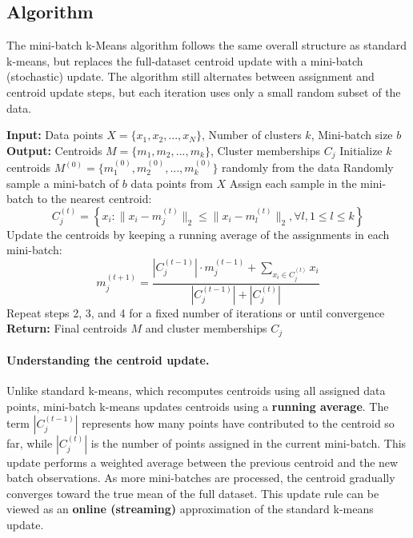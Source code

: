 \documentclass{article}
\begin{document}
\subsection{Algorithm}

The mini-batch k-Means algorithm follows the same overall structure as
standard k-means, but replaces the full-dataset centroid update with a
mini-batch (stochastic) update. The algorithm still alternates between
assignment and centroid update steps, but each iteration uses only a small
random subset of the data.

\begin{algorithm}[H]
\caption{Mini-batch k-Means Clustering Algorithm (Training Phase)}
\begin{algorithmic}[1]
\State \textbf{Input:} Data points $X = \{x_1, x_2, ..., x_N\}$, Number of clusters $k$, Mini-batch size $b$
\State \textbf{Output:} Centroids $M = \{m_1, m_2, ..., m_k\}$, Cluster memberships $C_j$
\State Initialize $k$ centroids $M^{(0)} = \{m_1^{(0)}, m_2^{(0)}, ..., m_k^{(0)}\}$ randomly from the data
\Repeat
    \State Randomly sample a mini-batch of $b$ data points from $X$
    \State Assign each sample in the mini-batch to the nearest centroid:
    \[
    C_j^{(t)} = \left\{ x_i : \|x_i - m_j^{(t)}\|_2 \leq \|x_i - m_l^{(t)}\|_2, \forall l, 1 \leq l \leq k \right\}
    \]
    \State Update the centroids by keeping a running average of the assignments in each mini-batch:
    \[
    m_j^{(t+1)} = \frac{|C_j^{(t-1)}| \cdot m_j^{(t-1)} + \sum_{x_i \in C_j^{(t)}} x_i}{|C_j^{(t-1)}| + |C_j^{(t)}|}
    \]
    \State Repeat steps 2, 3, and 4 for a fixed number of iterations or until convergence
\State \textbf{Return:} Final centroids $M$ and cluster memberships $C_j$
\end{algorithmic}
\end{algorithm}

\paragraph{Understanding the centroid update.}
Unlike standard k-means, which recomputes centroids using all assigned data
points, mini-batch k-means updates centroids using a \textbf{running average}.
The term $|C_j^{(t-1)}|$ represents how many points have contributed to the
centroid so far, while $|C_j^{(t)}|$ is the number of points assigned in the
current mini-batch. This update performs a weighted average between the
previous centroid and the new batch observations. As more mini-batches are
processed, the centroid gradually converges toward the true mean of the full
dataset. This update rule can be viewed as an \textbf{online (streaming)}
approximation of the standard k-means update.
\end{document}
